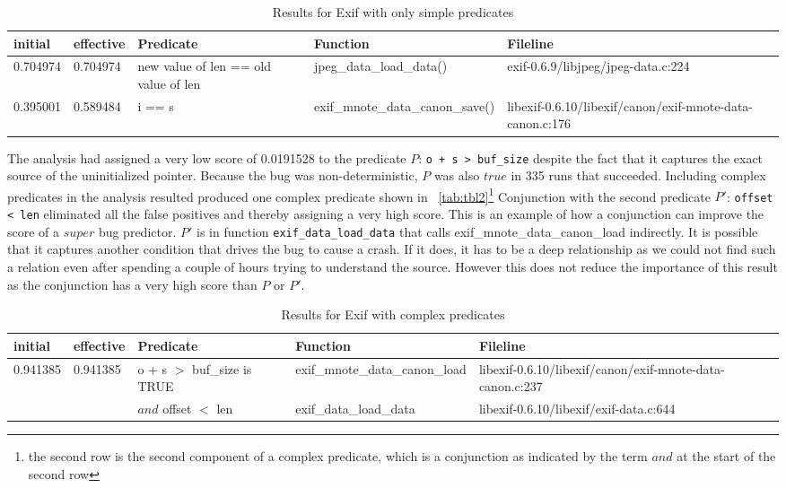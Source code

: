 \begin{table*}
\nocaptionrule
\caption{Results for Exif with only simple predicates}
\label{tab:tbl1}
\centering
\scriptsize
\begin{tabular}{lllll}
\toprule
initial & effective & Predicate & Function & File\:line \\
\midrule
0.704974 & 0.704974 & new value of len == old value of len & jpeg\_data\_load\_data() & exif-0.6.9/libjpeg/jpeg-data.c:224 \\
0.395001 & 0.589484 & i == s & exif\_mnote\_data\_canon\_save() & libexif-0.6.10/libexif/canon/exif-mnote-data-canon.c:176 \\
\bottomrule
\end{tabular}
\end{table*}

The analysis had assigned a very low score of 0.0191528 to the predicate $P$: \texttt{o + s > buf\_size} despite the fact that it captures the exact source of the uninitialized pointer.  Because the bug was non-deterministic, $P$ was also $true$ in 335 runs that succeeded.  Including complex predicates in the analysis resulted produced one complex predicate shown in ~\autoref{tab:tbl2}{\footnote{the second row is the second component of a complex predicate, which is a conjunction as indicated by the term $and$ at the start of the second row}}  Conjunction with the second predicate $P'$: \texttt{offset < len} eliminated all the false positives and thereby assigning a very high score.  This is an example of how a conjunction can improve the score of a $super$ bug predictor.  $P'$ is in function \texttt{exif\_data\_load\_data} that calls exif\_mnote\_data\_canon\_load indirectly.  It is possible that it captures another condition that drives the bug to cause a crash.  If it does, it has to be a deep relationship as we could not find such a relation even after spending a couple of hours trying to understand the source.  However this does not reduce the importance of this result as the conjunction has a very high score than $P$ or $P'$.

\begin{table*}
\nocaptionrule
\caption{Results for Exif with complex predicates}
\label{tab:tbl2}
\centering
\scriptsize
\begin{tabular}{lllll}
\toprule
initial & effective & Predicate & Function & File\:line \\
\midrule
0.941385 & 0.941385 & o + s $>$ buf\_size is TRUE & exif\_mnote\_data\_canon\_load &
 libexif-0.6.10/libexif/canon/exif-mnote-data-canon.c:237 \\
 
         &          & $and$ offset $<$ len & exif\_data\_load\_data & libexif-0.6.10/libexif/exif-data.c:644 \\
\bottomrule
\end{tabular}
\end{table*}

